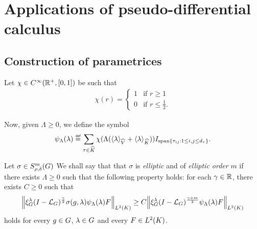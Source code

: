\chapter{Applications of pseudo-differential calculus}

\section{Construction of parametrices}

Let $\chi \in {C^\infty(\mathbb{R}^+, [0, 1])}$ be such that
\begin{align*}
    \chi(r) =
    \begin{cases}
        1 & \text{if } r \geq 1\\
        0 & \text{if } r \leq \frac 1 2.
    \end{cases}
\end{align*}

Now, given $\Lambda \geq 0$,
we define the symbol
\begin{align*}
    \psi_\Lambda(\lambda)
    \defeq \sum_{\tau \in \dualGroup \CompactGroup}
    \chi(\Lambda(\JapaneseBracket \VectorSpace \lambda + \JapaneseBracket \CompactGroup \lambda)) \Id {\Span \{\tau_{i j} : 1 \leq i, j \leq \dimRep \tau\}}.
\end{align*}

\begin{definition}[Ellipticity]
\label{definition:ellipticity}
    Let $\sigma \in S^{m}_{\rho, \delta}(G)$
    We shall say that that $\sigma$ is \emph{elliptic} and of \emph{elliptic order} $m$
    if there exists $\Lambda \geq 0$ such that the following property holds:
    for each $\gamma \in \mathbb{R}$,
    there exists $C \geq 0$ such that
    \begin{align}
        \norm [\Lebesgue 2 \CompactGroup] {\Rep \lambda \BesselPotential \gamma \sigma(g, \lambda) \psi_\Lambda(\lambda) F}
        \geq C
        \norm [\Lebesgue 2 \CompactGroup] {\Rep \lambda \BesselPotential {\gamma + m} \psi_\Lambda(\lambda) F}
        \label{eq:definition_of_ellipticity}
    \end{align}
    holds for every $g \in G$, $\lambda \in G$
    and every $F \in {L^{2} (K)}$.
\end{definition}

